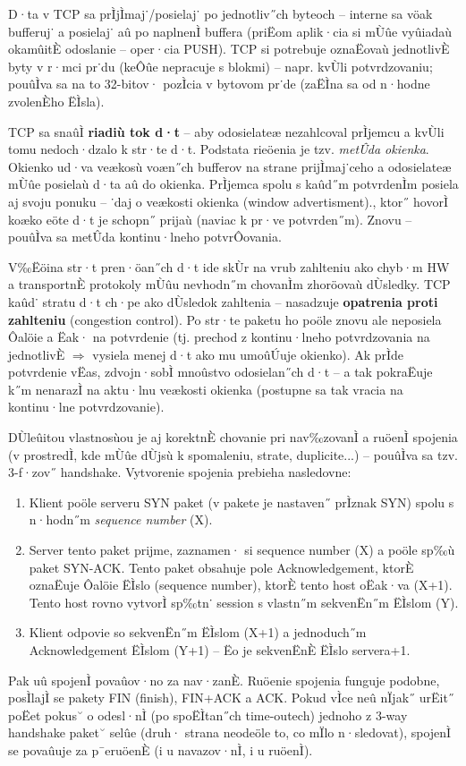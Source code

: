 D·ta v TCP sa prÌjÌmaj˙/posielaj˙ po jednotliv˝ch byteoch -- interne sa vöak bufferuj˙ a posielaj˙ aû po naplnenÌ buffera (priËom aplik·cia si mÙûe vyûiadaù okamûitÈ odoslanie -- oper·cia PUSH). TCP si potrebuje oznaËovaù jednotlivÈ byty v r·mci pr˙du (keÔûe nepracuje s blokmi) -- napr. kvÙli potvrdzovaniu; pouûÌva sa na to 32-bitov· pozÌcia v bytovom pr˙de (zaËÌna sa od n·hodne zvolenÈho ËÌsla).

TCP sa snaûÌ \textbf{riadiù tok d·t} -- aby odosielateæ nezahlcoval prÌjemcu a kvÙli tomu nedoch·dzalo k str·te d·t. Podstata rieöenia je tzv. \emph{metÛda okienka}. Okienko ud·va veækosù voæn˝ch bufferov na strane prijÌmaj˙ceho a odosielateæ mÙûe posielaù d·ta aû do  okienka. PrÌjemca spolu s kaûd˝m potvrdenÌm posiela aj svoju ponuku -- ˙daj o veækosti okienka (window advertisment)., ktor˝ hovorÌ koæko eöte d·t je schopn˝ prijaù (naviac k pr·ve potvrden˝m). Znovu -- pouûÌva sa metÛda kontinu·lneho potvrÔovania.

V‰Ëöina str·t pren·öan˝ch d·t ide skÙr na vrub zahlteniu ako chyb·m HW a transportnÈ protokoly mÙûu nevhodn˝m chovanÌm zhoröovaù dÙsledky. TCP kaûd˙ stratu d·t ch·pe ako dÙsledok zahltenia -- nasadzuje \textbf{opatrenia proti zahlteniu} (congestion control). Po str·te paketu ho poöle znovu ale neposiela Ôalöie a Ëak· na potvrdenie (tj. prechod z kontinu·lneho potvrdzovania na jednotlivÈ $\Rightarrow$ vysiela menej d·t ako mu umoûÚuje okienko). Ak prÌde potvrdenie vËas, zdvojn·sobÌ mnoûstvo odosielan˝ch d·t -- a tak pokraËuje k˝m nenarazÌ na aktu·lnu veækosti okienka (postupne sa tak vracia na kontinu·lne potvrdzovanie).

DÙleûitou vlastnosùou je aj korektnÈ chovanie pri nav‰zovanÌ a ruöenÌ spojenia (v prostredÌ, kde mÙûe dÙjsù k spomaleniu, strate, duplicite...) -- pouûÌva sa tzv. 3-f·zov˝ handshake. Vytvorenie spojenia prebieha nasledovne:
\begin{enumerate}
	\item Klient poöle serveru SYN paket (v pakete je nastaven˝ prÌznak SYN) spolu s n·hodn˝m \emph{sequence number} (X).
	\item Server tento paket prijme, zaznamen· si sequence number (X) a poöle sp‰ù paket SYN-ACK. Tento paket obsahuje pole Acknowledgement, ktorÈ oznaËuje Ôalöie ËÌslo (sequence number), ktorÈ tento host oËak·va (X+1). Tento host rovno vytvorÌ sp‰tn˙ session s vlastn˝m sekvenËn˝m ËÌslom (Y).
	\item Klient odpovie so sekvenËn˝m ËÌslom (X+1) a jednoduch˝m Acknowledgement ËÌslom (Y+1) -- Ëo je sekvenËnÈ ËÌslo servera+1.
\end{enumerate}
Pak uû spojenÌ povaûov·no za nav·zanÈ. Ruöenie spojenia funguje podobne, posÌlajÌ se pakety FIN (finish), FIN+ACK a ACK. Pokud vÌce neû nÏjak˝ urËit˝ poËet pokus˘ o odesl·nÌ (po spoËÌtan˝ch time-outech) jednoho z 3-way handshake paket˘ selûe (druh· strana neodeöle to, co mÏlo n·sledovat), spojenÌ se povaûuje za p¯eruöenÈ (i u navazov·nÌ, i u ruöenÌ).

